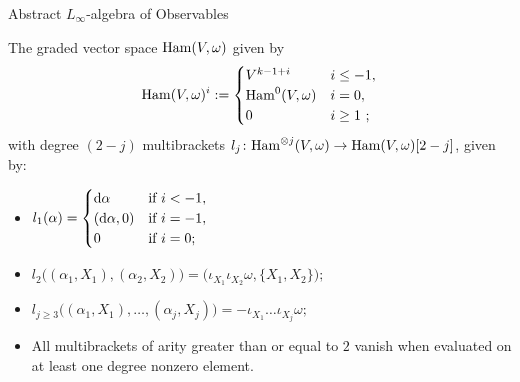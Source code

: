 \documentclass[beamer,10pt,handout]{standalone}  \Handouttrue
\begin{document}
\begin{frame}{Abstract {$L_\infty$}-algebra of Observables}


\begin{defblock}
  The graded vector space $\mathrm{Ham}(V, \omega)$  given by
  $$
  \mathrm{Ham}(V, \omega)^i := \begin{cases}
    V^{k-1 + i} & i \leq -1, \\
    \mathrm{Ham}^0(V, \omega) & i = 0,\\
    0 & i \geq 1~;
  \end{cases} 
  $$
  with degree $(2-j)$ multibrackets $l_j\colon \mathrm{Ham}^{\otimes j}(V, \omega) \to \mathrm{Ham}(V, \omega)[2-j]$, given by:

	\begin{itemize}
		\item $
			      l_1(\alpha) = \begin{cases}
				      \mathop{}\!\mathrm{d}\alpha      & \text{if } i < -1, \\
				      (\mathop{}\!\mathrm{d}\alpha, 0) & \text{if } i = -1, \\
				      0             & \text{if } i = 0;
			      \end{cases} $\\
		\item $
        l_2\big( (\alpha_1, X_1), (\alpha_2, X_2) \big) = \big( \iota_{X_1} \iota_{X_2} \omega, \{X_1, X_2\} \big);
		      $\\
		\item $
          l_{j\geq 3}\big( (\alpha_1, X_1), \dots, (\alpha_j, X_j) \big) = -\iota_{X_1} \dots \iota_{X_j} \omega;
		      $\\
		\item All multibrackets of arity greater than or equal to $2$ vanish when evaluated on at least one degree nonzero element.
	\end{itemize}
\end{defblock}
%


\end{frame}
\end{document}
